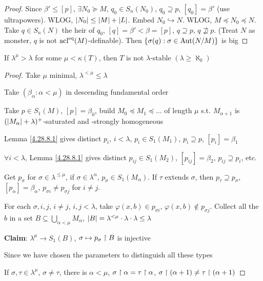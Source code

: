 \documentclass[11pt]{article}
\begin{document}
\begin{proof}
Since \(\beta'\le[p]\), \(\exists N_0\succeq M\), \(q_0\in S_n(N_0)\), \(q_0\supseteq p\), \([q_0]=\beta'\) (use ultrapowers).
WLOG, \(\abs{N_0}\le\abs{M}+\abs{L}\). Embed \(N_0\hookrightarrow N\). WLOG, \(M\preceq N_0\preceq N\). Take \(q\in S_n(N)\)
the heir of \(q_0\), \([q]=\beta'<\beta=[p]\), \(q\supseteq p\), \(q\not\sqsupseteq p\). (Treat \(N\) as monster, \(q\) is
not \(\operatorname{acl}^{\operatorname{eq}}(M)\)-definable). Then \(\{\sigma(q):\sigma\in\operatorname{\text{Aut}}(N/M)\}\) is big
\end{proof}

\begin{proposition}[]
\label{4.28.8.2}
If \(\lambda^\mu>\lambda\) for some \(\mu<\kappa(T)\), then \(T\) is not \(\lambda\)-stable \((\lambda\ge\aleph_0)\)
\end{proposition}

\begin{proof}
Take \(\mu\) minimal, \(\lambda^{<\mu}\le\lambda\)

Take \((\beta_\alpha:\alpha<\mu)\) in descending fundamental order

Take \(p\in S_1(M)\), \([p]=\beta_0\), build \(M_0\preceq M_1\preceq\dots\) of length \(\mu\) s.t. \(M_{\alpha+1}\)
is \((\abs{M_\alpha}+\lambda)^+\)-saturated and -strongly homogeneous

Lemma \ref{4.28.8.1} gives distinct \(p_i\), \(i<\lambda\), \(p_i\in S_1(M_1)\), \(p_i\supseteq p\), \([p_i]=\beta_1\)

\(\forall i<\lambda\), Lemma \ref{4.28.8.1} gives
distinct \(p_{ij}\in S_1(M_2)\), \([p_{ij}]=\beta_2\), \(p_{ij}\supseteq p_i\), etc.

Get \(p_\sigma\) for \(\sigma\in\lambda^{\le\mu}\), if \(\sigma\in\lambda^\alpha\), \(p_\sigma\in S_1(M_\alpha)\). If \(\tau\) extends \(\sigma\),
then \(p_\tau\supseteq p_\sigma\), \([p_\alpha]=\beta_\alpha\), \(p_{\sigma i}\neq p_{\sigma j}\) for \(i\neq j\).

For each \(\sigma,i,j\), \(i\neq j\), \(i,j<\lambda\), take \(\varphi(x,b)\in p_{\sigma i}\), \(\varphi(x,b)\notin p_{\sigma j}\). Collect
all the \(b\) in a set \(B\subseteq\bigcup_{\alpha<\mu}M_\alpha\), \(\abs{B}=\lambda^{<\mu}\cdot\lambda\cdot\lambda\le\lambda\)

\textbf{Claim}: \(\lambda^\mu\to S_1(B)\), \(\sigma\mapsto p_\sigma\upharpoonright B\) is injective

Since we have chosen the parameters to distinguish all these types

If \(\sigma,\tau\in \lambda^\mu\), \(\sigma\neq\tau\), there is \(\alpha<\mu\), \(\sigma\upharpoonright\alpha=\tau\upharpoonright\alpha\), \(\sigma\upharpoonright(\alpha+1)\neq\tau\upharpoonright(\alpha+1)\)
\end{proof}
\end{document}
